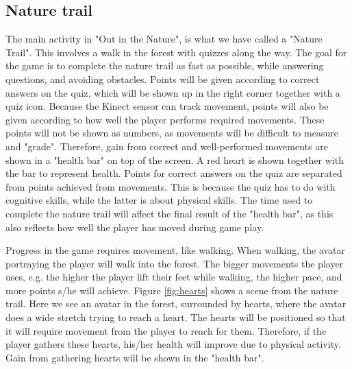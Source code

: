 \subsection{Nature trail}
The main activity in "Out in the Nature", is what we have called a "Nature Trail". This involves a walk in the forest with quizzes along the way. The goal for the game is to complete the nature trail as fast as possible, while answering questions, and avoiding obstacles. Points will be given according to correct answers on the quiz, which will be shown up in the right corner together with a quiz icon. Because the Kinect sensor can track movement, points will also be given according to how well the player performs required movements. These points will not be shown as numbers, as movements will be difficult to measure and "grade". Therefore, gain from correct and well-performed movements are shown in a "health bar" on top of the screen. A red heart is shown together with the bar to represent health. Points for correct answers on the quiz are separated from points achieved from movements. This is because the quiz has to do with cognitive skills, while the latter is about physical skills. The time used to complete the nature trail will affect the final result of the "health bar", as this also reflects how well the player has moved during game play.   

Progress in the game requires movement, like walking. When walking, the avatar portraying the player will walk into the forest. The bigger movements the player uses, e.g. the higher the player lift their feet while walking, the higher pace, and more points s/he will achieve. Figure \ref{fig:hearts} shows a scene from the nature trail. Here we see an avatar in the forest, surrounded by hearts, where the avatar does a wide stretch trying to reach a heart. The hearts will be positioned so that it will require movement from the player to reach for them. Therefore, if the player gathers these hearts, his/her health will improve due to physical activity. Gain from gathering hearts will be shown in the "health bar".   

